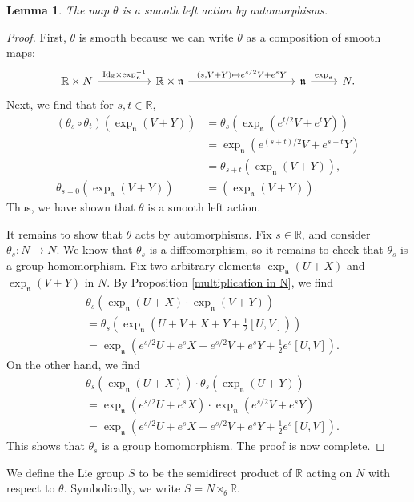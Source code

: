 \documentclass{amsart}
\newcommand{\R}{\mathbb R}
\newcommand{\id}{\text{\normalfont Id}}
\newcommand{\n}{\mathfrak n}
\theoremstyle{plain}
\newtheorem{lemma}[theorem]{Lemma}
\theoremstyle{definition}
\theoremstyle{remark}
\begin{document}
	\begin{lemma}
		The map $\theta$ is a smooth left action by automorphisms.
	\end{lemma}
	\begin{proof}
		First, $\theta$ is smooth because we can write $\theta$ as a composition of smooth maps:
		$$\begin{tikzcd}
			\R \times N \arrow{rr}{\id_\R \times \exp_\n^{-1}}  & & \R \times \n \arrow{rrrr}{(s,V+Y) \mapsto e^{s/2}V + e^s Y} &&&& \n \arrow{r}{\exp_\n}& N.
		\end{tikzcd}$$
		Next, we find that for $s,t \in \R$, 
		\begin{align*}
			(\theta_{s} \circ \theta_t)(\exp_\n(V+Y)) &= \theta_s(\exp_\n(e^{t/2}V + e^{t}Y))\\
			&=\exp_\n(e^{(s+t)/2}V + e^{s+t}Y) \\
			&= \theta_{s+t}(\exp_\n(V+Y)), \\
			\theta_{s=0}(\exp_\n(V+Y))  &= (\exp_\n(V+Y)).
		\end{align*}
		Thus, we have shown that $\theta$ is a smooth left action. 
		
		It remains to show that $\theta$ acts by automorphisms. Fix $s \in \R$, and consider $\theta_s:N \rightarrow N$. We know that $\theta_s$ is a diffeomorphism, so it remains to check that $\theta_s$ is a group homomorphism. Fix two arbitrary elements $\exp_\n(U+X)$ and $\exp_\n(V+Y)$ in $N$. By Proposition \ref{multiplication in N}, we find
		\begin{align*}
			&\theta_s\left(\exp_\n(U+X)\cdot \exp_\n(V+Y) \right) \\
			&= \theta_s\left(\exp_\n\left(U+V + X + Y + \frac12 [U,V]\right)\right) \\
			&= \exp_\n\left(e^{s/2} U + e^s X + e^{s/2} V + e^s Y + \frac12 e^s [U,V]\right).
		\end{align*}
		On the other hand, we find 
		\begin{align*}
			&\theta_s(\exp_\n(U+X)) \cdot \theta_s(\exp_\n(U+Y)) \\
			&= \exp_\n(e^{s/2} U + e^s X)\cdot \exp_n(e^{s/2} V + e^s Y) \\
			&= \exp_\n\left(e^{s/2} U + e^s X + e^{s/2} V + e^s Y + \frac12 e^s [U,V]\right).
		\end{align*}
		This shows that $\theta_s$ is a group homomorphism. The proof is now complete.
	\end{proof}

	We define the Lie group $S$ to be the semidirect product of $\R$ acting on $N$ with respect to $\theta$. Symbolically, we write $S = N \rtimes_\theta \R$. 
\end{document}
